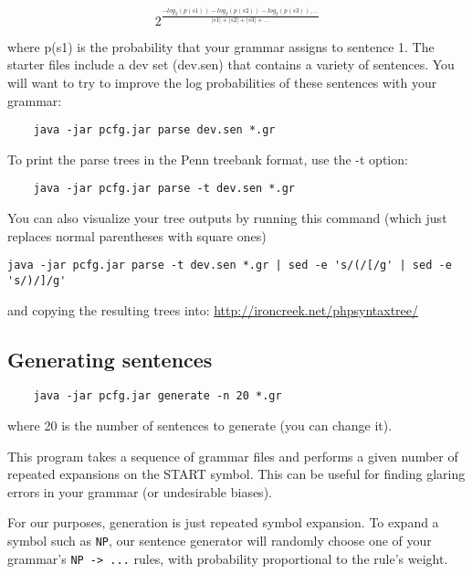\documentclass[12pt]{article}
\begin{document}
\begin{equation}
2^{\frac{-log_2(p(s1)) -log_2(p(s2)) -log_2(p(s3)), ... }{|s1|+|s2|+|s3|+...}}
\end{equation}

where p(s1) is the probability that your grammar assigns to sentence 1.
The starter files include a dev set (dev.sen) that contains a variety of sentences. You will want to try to improve the log probabilities of these sentences with your grammar:

\begin{verbatim}
    java -jar pcfg.jar parse dev.sen *.gr
\end{verbatim}

To print the parse trees in the Penn treebank format, use the -t option:

\begin{verbatim}
    java -jar pcfg.jar parse -t dev.sen *.gr
\end{verbatim}

You can also visualize your tree outputs by running this command (which just replaces normal parentheses with square ones)

\begin{verbatim}
java -jar pcfg.jar parse -t dev.sen *.gr | sed -e 's/(/[/g' | sed -e 's/)/]/g'
\end{verbatim}

and copying the resulting trees into: \url{http://ironcreek.net/phpsyntaxtree/}


\subsection*{Generating sentences}

\begin{verbatim}
    java -jar pcfg.jar generate -n 20 *.gr
\end{verbatim}

where 20 is the number of sentences to generate (you can change it).

This program takes a sequence of grammar files and performs a given number of repeated
expansions on the START symbol. This can be useful for finding glaring errors in your grammar (or undesirable biases).

For our purposes, generation is just repeated symbol expansion. To expand a symbol such as
\verb+NP+, our sentence generator will randomly choose one of your grammar's \verb+NP -> ...+ rules, with probability proportional to the rule's weight.
\end{document}
